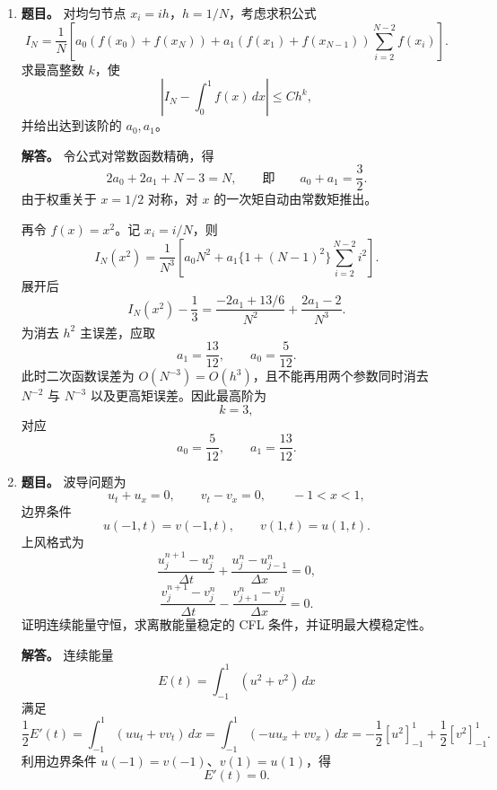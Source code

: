 ﻿\documentclass[UTF8,12pt]{ctexart}
\begin{document}
\begin{enumerate}[label=\textbf{\arabic*.},leftmargin=2.2em]
\textbf{解答。} 直接计算
\[
-\nabla\cdot(e^{-\varphi}\nabla(e^\varphi u))
=-\nabla\cdot(\nabla u+u\nabla\varphi)
=-\Delta u-\nabla\cdot(u\nabla\varphi)=Fu.
\]
令
\[
u=e^{-\varphi/2}v.
\]
则
\[
e^{\varphi/2}F(e^{-\varphi/2}v)
=-\Delta v+\left(\frac14|\nabla\varphi|^2-\frac12\Delta\varphi\right)v.
\]
因此 \(F\) 与自伴算子
\[
S=-\Delta+\frac14|\nabla\varphi|^2-\frac12\Delta\varphi
\]
相似；相似变换不改变特征值。Witten Laplacian 在零形式上的表达正是同一个 \(S\)，故三者具有相同谱。

平衡解满足 \(Fu=0\)。由散度型，
\[
0=\int_{\mathbb T^n} e^{-\varphi}\left|\nabla(e^\varphi u)\right|^2dx,
\]
故 \(e^\varphi u\) 为常数，即
\[
u=C e^{-\varphi}.
\]
对应到共轭算子，\(S\) 的零模为
\[
v=C e^{-\varphi/2}.
\]

\item \textbf{题目。} 对均匀节点 \(x_i=ih\)，\(h=1/N\)，考虑求积公式
\[
I_N=\frac1N\left[
a_0(f(x_0)+f(x_N))+a_1(f(x_1)+f(x_{N-1}))
\sum_{i=2}^{N-2}f(x_i)
\right].
\]
求最高整数 \(k\)，使
\[
\left|I_N-\int_0^1f(x)\,dx\right|\le Ch^k,
\]
并给出达到该阶的 \(a_0,a_1\)。

\textbf{解答。} 令公式对常数函数精确，得
\[
2a_0+2a_1+N-3=N,
\qquad\text{即}\qquad
a_0+a_1=\frac32.
\]
由于权重关于 \(x=1/2\) 对称，对 \(x\) 的一次矩自动由常数矩推出。

再令 \(f(x)=x^2\)。记 \(x_i=i/N\)，则
\[
I_N(x^2)=\frac1{N^3}\left[
a_0N^2+a_1\{1+(N-1)^2\}
\sum_{i=2}^{N-2}i^2\right].
\]
展开后
\[
I_N(x^2)-\frac13
=\frac{-2a_1+13/6}{N^2}+\frac{2a_1-2}{N^3}.
\]
为消去 \(h^2\) 主误差，应取
\[
a_1=\frac{13}{12},\qquad a_0=\frac{5}{12}.
\]
此时二次函数误差为 \(O(N^{-3})=O(h^3)\)，且不能再用两个参数同时消去 \(N^{-2}\) 与 \(N^{-3}\) 以及更高矩误差。因此最高阶为
\[
k=3,
\]
对应
\[
\boxed{a_0=\frac5{12},\qquad a_1=\frac{13}{12}.}
\]

\item \textbf{题目。} 波导问题为
\[
u_t+u_x=0,\qquad v_t-v_x=0,\qquad -1<x<1,
\]
边界条件
\[
u(-1,t)=v(-1,t),\qquad v(1,t)=u(1,t).
\]
上风格式为
\[
\frac{u_j^{n+1}-u_j^n}{\Delta t}
+\frac{u_j^n-u_{j-1}^n}{\Delta x}=0,
\]
\[
\frac{v_j^{n+1}-v_j^n}{\Delta t}
-\frac{v_{j+1}^n-v_j^n}{\Delta x}=0.
\]
证明连续能量守恒，求离散能量稳定的 CFL 条件，并证明最大模稳定性。

\textbf{解答。} 连续能量
\[
E(t)=\int_{-1}^1(u^2+v^2)\,dx
\]
满足
\[
\frac12E'(t)=\int_{-1}^1(uu_t+vv_t)\,dx
=\int_{-1}^1(-uu_x+vv_x)\,dx
=-\frac12[u^2]_{-1}^1+\frac12[v^2]_{-1}^1.
\]
利用边界条件 \(u(-1)=v(-1)\)、\(v(1)=u(1)\)，得
\[
E'(t)=0.
\]


\end{enumerate}
\end{document}
